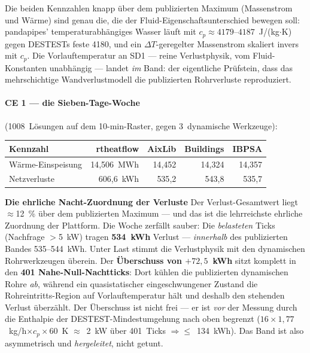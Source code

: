 \documentclass[11pt,a4paper,parskip=half]{scrreprt}
\newenvironment{beispiel}[1][Beispiel]
  {\par\medskip{\color{bsp}\hrule height 0.8pt}\nopagebreak\smallskip
   \noindent\textbf{\textsf{\textcolor{bsp}{#1}}}\quad\ignorespaces}
  {\par\nopagebreak\smallskip{\color{bsp}\hrule height 0.8pt}\par\medskip}
\begin{document}
Die beiden Kennzahlen knapp über dem publizierten Maximum (Massenstrom und
Wärme) sind genau die, die der Fluid-Eigenschaftsunterschied bewegen soll:
pandapipes' temperaturabhängiges Wasser läuft mit $c_p\approx4179$--$4187$~J/(kg$\cdot$K)
gegen DESTESTs feste 4180, und ein $\Delta T$-geregelter Massenstrom skaliert
invers mit $c_p$. Die Vorlauftemperatur an SD1 --- reine Verlustphysik, vom
Fluid-Konstanten unabhängig --- landet \emph{im} Band: der eigentliche
Prüfstein, dass das mehrschichtige Wandverlustmodell die publizierten
Rohrverluste reproduziert.

\paragraph{CE 1 --- die Sieben-Tage-Woche} (1008~Lösungen auf dem 10-min-Raster,
gegen 3~dynamische Werkzeuge):

{\small
\begin{center}
\begin{tabular}{@{}lrrrr@{}}
\toprule
Kennzahl & rtheatflow & AixLib & Buildings & IBPSA \\
\midrule
Wärme-Einspeisung & 14{,}506~MWh & 14{,}452 & 14{,}324 & 14{,}357 \\
Netzverluste      & 606{,}6~kWh  & 535{,}2  & 543{,}8  & 535{,}7 \\
\bottomrule
\end{tabular}
\end{center}}

\begin{beispiel}[Die ehrliche Nacht-Zuordnung der Verluste]
Der Verlust-Gesamtwert liegt $\approx$12~\% über dem publizierten Maximum ---
und das ist die lehrreichste ehrliche Zuordnung der Plattform. Die Woche
zerfällt sauber: Die \emph{belasteten} Ticks (Nachfrage $>$5~kW) tragen
\textbf{534~kWh} Verlust --- \emph{innerhalb} des publizierten Bandes
535--544~kWh. Unter Last stimmt die Verlustphysik mit den dynamischen
Rohrwerkzeugen überein. Der \textbf{Überschuss von $+72{,}5$~kWh} sitzt komplett
in den \textbf{401 Nahe-Null-Nachtticks}: Dort kühlen die publizierten
dynamischen Rohre \emph{ab}, während ein quasistatischer eingeschwungener
Zustand die Rohreintritts-Region auf Vorlauftemperatur hält und deshalb den
stehenden Verlust überzählt. Der Überschuss ist nicht frei --- er ist \emph{vor}
der Messung durch die Enthalpie der DESTEST-Mindestumgehung nach oben begrenzt
($16\times1{,}77$~kg/h$\times c_p\times60$~K $\approx$~2~kW über 401~Ticks
$\Rightarrow\leq$~134~kWh). Das Band ist also asymmetrisch und \emph{hergeleitet},
nicht getunt.
\end{beispiel}
\end{document}

